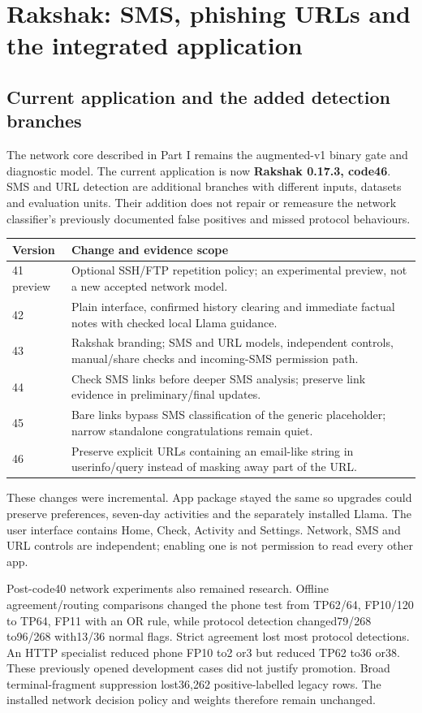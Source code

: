 \part{Rakshak: SMS, phishing URLs and the integrated application}
\chapter{Current application and the added detection branches}
The network core described in Part I remains the augmented-v1 binary gate and diagnostic model. The current application is now \textbf{Rakshak 0.17.3, code46}. SMS and URL detection are additional branches with different inputs, datasets and evaluation units. Their addition does not repair or remeasure the network classifier's previously documented false positives and missed protocol behaviours.

\begin{longtable}{@{}lp{}@{}}
\toprule Version & Change and evidence scope\\\midrule\endhead
41 preview & Optional SSH/FTP repetition policy; an experimental preview, not a new accepted network model.\\
42 & Plain interface, confirmed history clearing and immediate factual notes with checked local Llama guidance.\\
43 & Rakshak branding; SMS and URL models, independent controls, manual/share checks and incoming-SMS permission path.\\
44 & Check SMS links before deeper SMS analysis; preserve link evidence in preliminary/final updates.\\
45 & Bare links bypass SMS classification of the generic placeholder; narrow standalone congratulations remain quiet.\\
46 & Preserve explicit URLs containing an email-like string in userinfo/query instead of masking away part of the URL.\\
\bottomrule\end{longtable}

These changes were incremental. App package  stayed the same so upgrades could preserve preferences, seven-day activities and the separately installed Llama. The user interface contains Home, Check, Activity and Settings. Network, SMS and URL controls are independent; enabling one is not permission to read every other app.

Post-code40 network experiments also remained research. Offline agreement/routing comparisons changed the phone test from TP62/64, FP10/120 to TP64, FP11 with an OR rule, while protocol detection changed79/268 to96/268 with13/36 normal flags. Strict agreement lost most protocol detections. An HTTP specialist reduced phone FP10 to2 or3 but reduced TP62 to36 or38. These previously opened development cases did not justify promotion. Broad terminal-fragment suppression lost36,262 positive-labelled legacy rows. The installed network decision policy and weights therefore remain unchanged.

